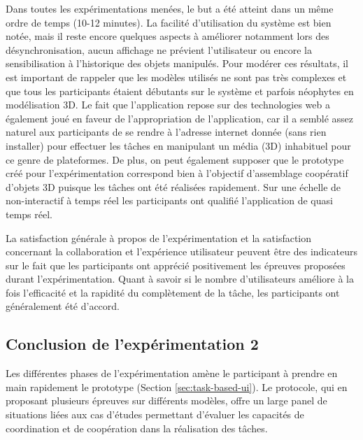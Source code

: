 Dans toutes les expérimentations menées, le but a été atteint dans 
un même ordre de temps (10-12 minutes). La facilité d'utilisation du système est 
bien notée, mais il reste encore quelques aspects à améliorer notamment lors des 
désynchronisation, aucun affichage ne prévient l'utilisateur ou encore la 
sensibilisation à l'historique des objets manipulés. 
Pour modérer ces résultats, il est important de rappeler que les modèles utilisés 
ne sont pas très complexes et que tous les participants étaient débutants sur le 
système et parfois néophytes en modélisation 3D.
Le fait que l'application repose sur des technologies web a également joué en 
faveur de l'appropriation de l'application, car il a semblé assez naturel aux 
participants de se rendre à l'adresse internet donnée (sans rien installer) pour 
effectuer les tâches en manipulant un média (3D) inhabituel pour ce genre de 
plateformes. 
De plus, on peut également supposer que le prototype créé pour l'expérimentation 
correspond bien à l'objectif d'assemblage coopératif d'objets \gls{3D} puisque les 
tâches ont été réalisées rapidement. Sur une échelle de \og non-interactif \fg{} à 
\og temps réel\fg{} les participants ont qualifié l'application de \og quasi temps 
réel\fg{}. 

La satisfaction générale à propos de l'expérimentation et la satisfaction concernant 
la collaboration et l'expérience utilisateur peuvent être des indicateurs sur le fait 
que les participants ont apprécié positivement les épreuves proposées durant 
l'expérimentation. 
Quant à savoir si le nombre d'utilisateurs améliore à la fois l'efficacité et la rapidité 
du complètement de la tâche, les participants ont généralement été d'accord.

\subsection{Conclusion de l'expérimentation 2}

Les différentes phases de l'expérimentation amène le participant à prendre en 
main rapidement le prototype (Section \ref{sec:task-based-ui}). 
Le protocole, qui en proposant plusieurs épreuves sur différents modèles, offre un
large panel de situations liées aux cas d'études permettant d'évaluer les capacités 
de coordination et de coopération dans la réalisation des tâches.

